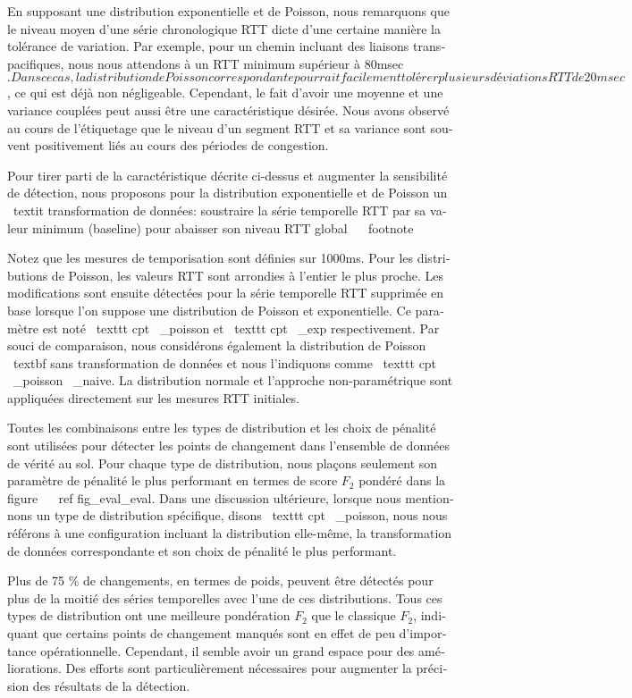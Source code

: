\begin{otherlanguage}{french}
En supposant une distribution exponentielle et de Poisson, nous remarquons que le niveau moyen d'une série chronologique RTT dicte d'une certaine manière la tolérance de variation.
Par exemple, pour un chemin incluant des liaisons transpacifiques, nous nous attendons à un RTT minimum supérieur à 80msec $.
Dans ce cas, la distribution de Poisson correspondante pourrait facilement tolérer plusieurs déviations RTT de 20 msec $, ce qui est déjà non négligeable.
Cependant, le fait d'avoir une moyenne et une variance couplées peut aussi être une caractéristique désirée.
Nous avons observé au cours de l'étiquetage que le niveau d'un segment RTT et sa variance sont souvent positivement liés au cours des périodes de congestion.

Pour tirer parti de la caractéristique décrite ci-dessus et augmenter la sensibilité de détection, nous proposons pour la distribution exponentielle et de Poisson un \ textit {transformation de données}: soustraire la série temporelle RTT par sa valeur minimum (baseline) pour abaisser son niveau RTT global ~ \ footnote {Notez que les mesures de temporisation sont définies sur 1000ms.
Pour les distributions de Poisson, les valeurs RTT sont arrondies à l'entier le plus proche.
Les modifications sont ensuite détectées pour la série temporelle RTT supprimée en base lorsque l'on suppose une distribution de Poisson et exponentielle.
Ce paramètre est noté \ texttt {cpt \ _poisson} et \ texttt {cpt \ _exp} respectivement.
Par souci de comparaison, nous considérons également la distribution de Poisson \ textbf {sans transformation de données} et nous l'indiquons comme \ texttt {cpt \ _poisson \ _naive}.
La distribution normale et l'approche non-paramétrique sont appliquées directement sur les mesures RTT initiales.

Toutes les combinaisons entre les types de distribution et les choix de pénalité sont utilisées pour détecter les points de changement dans l'ensemble de données de vérité au sol.
Pour chaque type de distribution, nous plaçons seulement son paramètre de pénalité le plus performant en termes de score $ F_2 $ pondéré dans la figure ~ \ ref {fig_eval_eval}.
Dans une discussion ultérieure, lorsque nous mentionnons un type de distribution spécifique, disons \ texttt {cpt \ _poisson}, nous nous référons à une configuration incluant la distribution elle-même, la transformation de données correspondante et son choix de pénalité le plus performant.

Plus de 75 $ \% $ de changements, en termes de poids, peuvent être détectés pour plus de la moitié des séries temporelles avec l'une de ces distributions.
Tous ces types de distribution ont une meilleure pondération $ F_2 $ que le classique $ F_2 $, indiquant que certains points de changement manqués sont en effet de peu d'importance opérationnelle.
Cependant, il semble avoir un grand espace pour des améliorations.
Des efforts sont particulièrement nécessaires pour augmenter la précision des résultats de la détection.

}
\end{otherlanguage}
